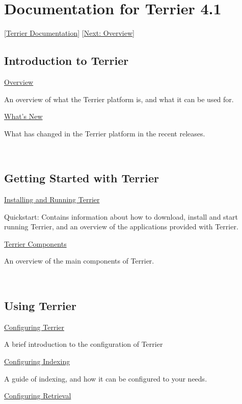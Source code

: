 \section{\texorpdfstring{\href{}{}Documentation for Terrier
4.1}{Documentation for Terrier 4.1}}\label{documentation-for-terrier-4.1}

{[}\href{index.html}{Terrier Documentation}{]}
{[}\href{overview.html}{Next: Overview}{]}

\subsection{Introduction to Terrier}\label{introduction-to-terrier}

\href{overview.html}{Overview}

An overview of what the Terrier platform is, and what it can be used
for.

\href{whats_new.html}{What's New}

What has changed in the Terrier platform in the recent releases.

~

\subsection{Getting Started with
Terrier}\label{getting-started-with-terrier}

\href{quickstart.html}{Installing and Running Terrier}

Quickstart: Contains information about how to download, install and
start running Terrier, and an overview of the applications provided with
Terrier.

\href{basicComponents.html}{Terrier Components}

An overview of the main components of Terrier.

~

\subsection{Using Terrier}\label{using-terrier}

\href{configure_general.html}{Configuring Terrier}

A brief introduction to the configuration of Terrier

\href{configure_indexing.html}{Configuring Indexing}

A guide of indexing, and how it can be configured to your needs.

\href{configure_retrieval.html}{Configuring Retrieval}

